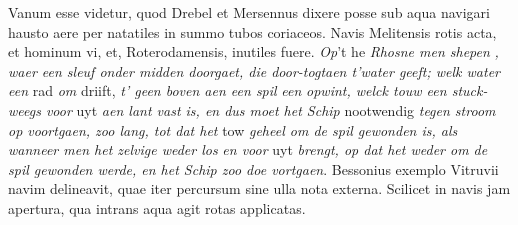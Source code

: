 \pend 
\pstart Vanum esse videtur, quod Drebel\protect{} et Mersennus\protect{} dixere posse sub aqua navigari hausto aere per natatiles in summo tubos coriaceos\protect{}.
\pend 
\pstart Navis Melitensis\protect{} rotis\protect{} acta, et hominum vi\protect{}, et, Roterodamensis\protect{}, inutiles fuere. \textit{Op}'t he \textit{Rhosne men shepen}\protect{} \textit{, waer een sleuf onder midden doorgaet, die door-togtaen t'water geeft; welk water een} rad\protect{} \textit{om} driift, \textit{t' geen boven aen een spil}\protect{} \textit{een}  \textit{opwint, welck touw een stuck-weegs voor} uyt \textit{aen lant vast is, en dus moet het Schip}\protect{} nootwendig \textit{tegen stroom op voortgaen, zoo lang, tot dat het} tow \textit{geheel om de spil\protect{} gewonden is, als wanneer men het zelvige weder los}  \textit{en voor} uyt \textit{brengt, op dat het weder om de spil\protect{} gewonden werde, en het Schip\protect{} zoo doe vortgaen}.
\pend 
\pstart Bessonius\protect{} exemplo Vitruvii\protect{} navim\protect{} delineavit, quae iter percursum sine ulla nota externa. Scilicet in navis\protect{} jam apertura, qua intrans aqua agit rotas\protect{}  applicatas.
\pend 
